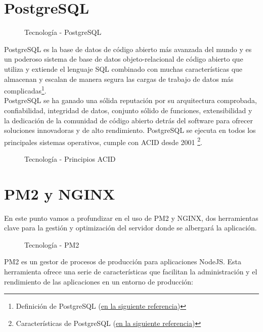\newpage

\section{PostgreSQL}

\begin{figure}[h]
\centering
 \caption{Tecnología - PostgreSQL}
\end{figure}

PostgreSQL es la base de datos de código abierto más avanzada del mundo y es un poderoso sistema de base de datos objeto-relacional de código abierto que utiliza y extiende el lenguaje SQL combinado con muchas características que almacenan y escalan de manera segura las cargas de trabajo de datos más complicadas\footnote{Definición de PostgreSQL (\href{https://hoplasoftware.com/postgresql-base-de-datos-relacional-codigo-abierto/}{en la siguiente referencia})}.\\

PostgreSQL se ha ganado una sólida reputación por su arquitectura comprobada, confiabilidad, integridad de datos, conjunto sólido de funciones, extensibilidad y la dedicación de la comunidad de código abierto detrás del software para ofrecer soluciones innovadoras y de alto rendimiento. PostgreSQL se ejecuta en todos los principales sistemas operativos, cumple con ACID desde 2001 \footnote{Características de PostgreSQL (\href{https://www.postgresql.org/about/}{en la siguiente referencia})}.\\

\begin{figure}[h]
\centering
    	\caption{Tecnología - Principios ACID}
\end{figure}

\newpage

\section{PM2 y NGINX}
En este punto vamos a profundizar en el uso de PM2 y NGINX, dos herramientas clave para la gestión y optimización del servidor donde se albergará la aplicación.

\begin{figure}[h]
  \centering
   \caption{Tecnología - PM2}
\end{figure}
  
  PM2 es un gestor de procesos de producción para aplicaciones NodeJS. Esta herramienta ofrece una serie de características que facilitan la administración y el rendimiento de las aplicaciones en un entorno de producción:

